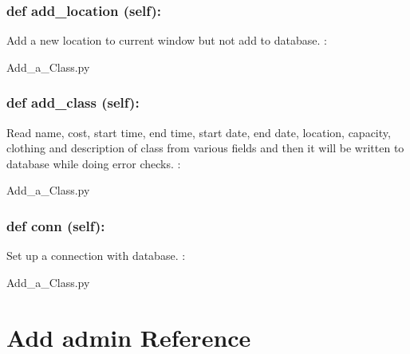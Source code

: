 \hypertarget{class_poly_a14a7ad77ce612b0c54f531d307ee4b39}{
\subsubsection[{def add_location (self):}]{\setlength{\rightskip}{0pt plus 5cm}def {add\_location} (self):}}\label{class_poly_a14a7ad77ce612b0c54f531d307ee4b39}
Add a new location to current window but not add to database.
:\begin{DoxyCompactItemize}
\item 
Add\_a\_Class.\-py\end{DoxyCompactItemize}

\hypertarget{class_poly_a14a7ad77ce612b0c54f531d307ee4b39}{
\subsubsection[{def add_class (self):}]{\setlength{\rightskip}{0pt plus 5cm}def {add\_class} (self):}}\label{class_poly_a14a7ad77ce612b0c54f531d307ee4b39}
Read name, cost, start time, end time, start date, end date, location, capacity, clothing and description of class from various fields and then it will be written to database while doing error checks. 
:\begin{DoxyCompactItemize}
\item 
Add\_a\_Class.\-py\end{DoxyCompactItemize}

\hypertarget{class_poly_a14a7ad77ce612b0c54f531d307ee4b39}{
\subsubsection[{def conn (self):}]{\setlength{\rightskip}{0pt plus 5cm}def {conn} (self):}}\label{class_poly_a14a7ad77ce612b0c54f531d307ee4b39}
Set up a connection with database.
:\begin{DoxyCompactItemize}
\item 
Add\_a\_Class.\-py\end{DoxyCompactItemize}


\hypertarget{Add_admin}{\section{Add admin Reference}
\label{Add_admin}
}
